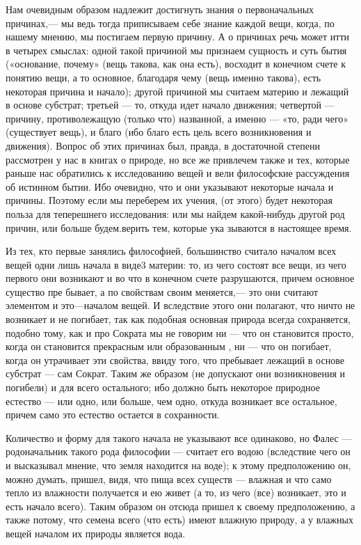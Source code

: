 \documentclass{article}
\begin{document}
Нам очевидным образом надлежит достигнуть знания о первоначальных причинах,— мы ведь тогда приписываем себе знание каждой вещи, когда, по нашему мнению, мы постигаем первую причину.
\footnotemark[1]
А о причинах речь может итти в четырех смыслах: одной такой причиной мы признаем сущность и суть бытия
\footnotemark[2]
(«основание, почему»
\footnotemark[20]
(вещь такова, как она есть), восходит в конечном счете к понятию вещи, а то основное, благодаря чему (вещь именно такова), есть некоторая причина и начало);
\footnotemark[21]
другой причиной мы считаем материю и лежащий в основе субстрат;
\footnotemark[3]
третьей — то, откуда идет начало движения; четвертой — причину, противолежащую (только что) названной, а именно — «то, ради чего» (существует вещь), и благо (ибо благо есть цель всего возникновения и движения). Вопрос об этих причинах был, правда, в достаточной степени рассмотрен у нас в книгах о природе,
\footnotemark[18]
но все же привлечем также и тех, которые раньше нас обратились к исследованию вещей и вели философские рассуждения об истинном бытии. Ибо очевидно, что и они указывают некоторые начала и причины. Поэтому если мы переберем их учения, (от этого) будет некоторая польза для теперешнего исследования: или мы найдем какой-нибудь другой род причин, или больше будем.верить тем, которые ука зываются в настоящее время.

Из тех, кто первые занялись философией, большинство считало началом всех вещей одни лишь начала в виде3  материи: то, из чего состоят все вещи, из чего первого они возникают и во что в конечном счете разрушаются, причем основное существо пре бывает, а по свойствам своим меняется,— это они считают элементом и это—началом вещей. И вследствие этого они полагают, что ничто не возникает и не погибает, так как подобная основная природа
\footnotemark[4]
всегда сохраняется, подобно тому, как и про Сократа мы не говорим ни — что он становится просто, когда он становится прекрасным или образованным
\footnotemark[5]
, ни — что он погибает, когда он утрачивает эти свойства, ввиду того, что пребывает лежащий в основе субстрат — сам Сократ. Таким же образом (не допускают они возникновения и погибели) и для всего остального; ибо должно быть некоторое природное естество
\footnotemark[19]
— или одно, или больше, чем одно, откуда возникает все остальное, причем само это естество остается в сохранности.

Количество и форму для такого начала не указывают все одинаково, но Фалес — родоначальник такого рода философии — считает его водою (вследствие чего он и высказывал мнение, что земля находится на воде); к этому предположению он, можно думать, пришел, видя, что пища всех существ — влажная и что само тепло из влажности получается и ею живет (а то, из чего (все) возникает, это и есть начало всего). Таким образом он отсюда пришел к своему предположению, а также потому, что семена всего (что есть) имеют влажную природу, а у влажных вещей началом их природы является вода.
\end{document}
